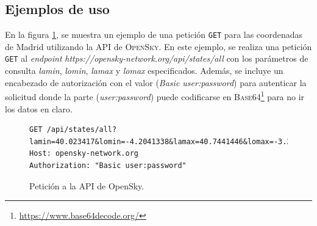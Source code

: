 \documentclass[a4paper, 11pt]{book}
\begin{document}
\subsection{Ejemplos de uso}
En la figura \ref{fig:getOpensky}, se muestra un ejemplo de una petición \texttt{GET} para las coordenadas de Madrid utilizando la \gls{API} de \textsc{OpenSky}.
En este ejemplo, se realiza una petición \texttt{GET} al \emph{endpoint} \emph{https://opensky-network.org/api/states/all} con los parámetros de consulta \emph{lamin}, \emph{lomin}, \emph{lamax} y \emph{lomax} especificados. Además, se incluye un encabezado de autorización con el valor (\emph{Basic user:password}) para autenticar la solicitud donde la parte (\emph{user:password}) puede codificarse en \textsc{Base64}\footnote{\url{https://www.base64decode.org/}} para no ir los datos en claro.
\begin{figure}[h]
	\centering
	\begin{verbatim}
GET /api/states/all?lamin=40.023417&lomin=-4.2041338&lamax=40.7441446&lomax=-3.2538165
Host: opensky-network.org
Authorization: "Basic user:password"
	\end{verbatim}
	\caption{Petición a la API de OpenSky.}
	\label{fig:getOpensky}
\end{figure}
\end{document}

